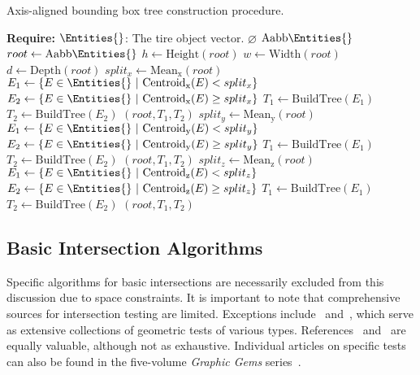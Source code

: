 \begin{algorithm}[!ht]
  \caption{Axis-aligned bounding box tree construction procedure.}
  \label{app1:acme_aabbtree_construction}
  \begin{algorithmic}
    \State \textbf{Require:} $\Entities{}$: The tire \Entities{} object vector.
        \State \Return $\varnothing$
      \EndIf
        \State \Return $\mathrm{Aabb}{\Entities{}}$
      \EndIf
      \State $root \gets \mathrm{Aabb}{\Entities{}}$
      \State $h \gets \mathrm{Height}(root)$
      \State $w \gets \mathrm{Width}(root)$
      \State $d \gets \mathrm{Depth}(root)$
        \State $split_{x} \gets \mathrm{Mean_{x}}(root)$
        \State $E_1 \gets \left\{E \in \Entities{} ~|~ \mathrm{Centroid_{x}}(E) < split_{x} \right\}$
        \State $E_2 \gets \left\{E \in \Entities{} ~|~ \mathrm{Centroid_{x}}(E) \ge split_{x} \right\}$
        \State $T_1 \gets \mathrm{BuildTree}(E_1)$
        \State $T_2 \gets \mathrm{BuildTree}(E_2)$
        \State \Return $(root, T_1, T_2)$
        \State $split_{y} \gets \mathrm{Mean_{y}}(root)$
        \State $E_1 \gets \left\{E \in \Entities{} ~|~ \mathrm{Centroid_{y}}(E) < split_{y} \right\}$
        \State $E_2 \gets \left\{E \in \Entities{} ~|~ \mathrm{Centroid_{y}}(E) \ge split_{y} \right\}$
        \State $T_1 \gets \mathrm{BuildTree}(E_1)$
        \State $T_2 \gets \mathrm{BuildTree}(E_2)$
        \State \Return $(root, T_1, T_2)$
      \Else
        \State $split_{z} \gets \mathrm{Mean_{z}}(root)$
        \State $E_1 \gets \left\{E \in \Entities{} ~|~ \mathrm{Centroid_{z}}(E) < split_{z} \right\}$
        \State $E_2 \gets \left\{E \in \Entities{} ~|~ \mathrm{Centroid_{z}}(E) \ge split_{z} \right\}$
        \State $T_1 \gets \mathrm{BuildTree}(E_1)$
        \State $T_2 \gets \mathrm{BuildTree}(E_2)$
        \State \Return $(root, T_1, T_2)$
      \EndIf
    \EndFunction
  \end{algorithmic}
\end{algorithm}

\subsection{Basic Intersection Algorithms}

Specific algorithms for basic intersections are necessarily excluded from this discussion due to space constraints. It is important to note that comprehensive sources for intersection testing are limited. Exceptions include~\cite{schneider2002geometric} and~\cite{eberly2020robust}, which serve as extensive collections of geometric tests of various types. References~\cite{ericson2004realtime} and~\cite{vandenbergen2003collision} are equally valuable, although not as exhaustive. Individual articles on specific tests can also be found in the five-volume \emph{Graphic Gems} series~\cite{glassner1990graphics, arvo1991graphics, kirk1992graphics, heckbert1994graphics, paeth1995graphics}.

